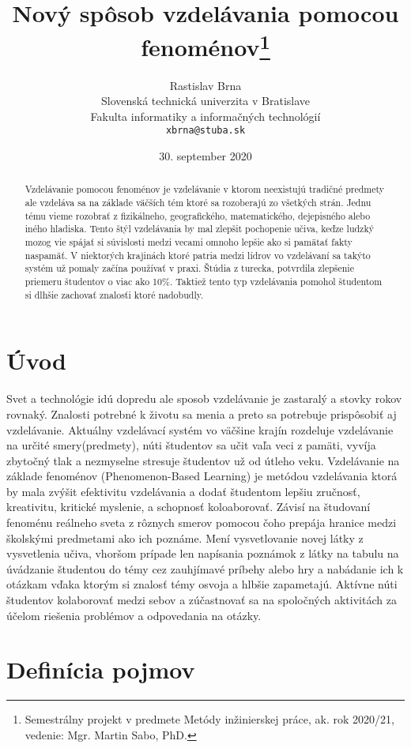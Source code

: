 \documentclass[10pt,slovak,a4paper]{article}
\title{Nový spôsob vzdelávania pomocou fenoménov\thanks{Semestrálny projekt v predmete Metódy inžinierskej práce, ak. rok 2020/21, vedenie: Mgr. Martin Sabo, PhD.}} %
\author{Rastislav Brna\\[2pt]
	{\small Slovenská technická univerzita v Bratislave}\\
	{\small Fakulta informatiky a informačných technológií}\\
	{\small \texttt{xbrna@stuba.sk}}
	}
\date{\small 30. september 2020} %
\begin{document}
\maketitle

\begin{abstract}
	Vzdelávanie pomocou fenoménov je vzdelávanie v ktorom neexistujú 
	tradičné predmety ale vzdeláva sa na základe väčších tém ktoré sa rozoberajú zo všetkých strán.
	Jednu tému vieme rozobrať z fizikálneho, geografického, matematického, dejepisného alebo iného 
	hladiska. Tento štýl vzdelávania by mal zlepšit pochopenie učiva, keďze ludzký mozog vie spájať 
	si súvislosti medzi vecami omnoho lepšie ako si pamätať fakty naspamäť. V niektorých krajinách ktoré
	patria medzi lídrov vo vzdelávaní sa takýto systém už pomaly začína používať v praxi. Štúdia z turecka,
	potvrdila zlepšenie priemeru študentov o viac ako 10\%. Taktiež tento typ vzdelávania pomohol študentom 
	si dlhšie zachovať znalosťi ktoré nadobudly.\cite{jcer553507} 
\end{abstract}

\section{Úvod}

Svet a technológie idú dopredu ale sposob vzdelávanie je zastaralý a stovky rokov rovnaký. Znalosti potrebné k
životu sa menia a preto sa potrebuje prispôsobiť aj vzdelávanie. Aktuálny vzdelávací systém vo väčšine krajín 
rozdeluje vzdelávanie na určité smery(predmety), núti študentov sa učit vaľa veci z pamäti, vyvíja zbytočný tlak
a nezmyselne stresuje študentov už od útleho veku. Vzdelávanie na základe
fenoménov (Phenomenon-Based Learning) je metódou vzdelávania ktorá by mala zvýšit efektivitu vzdelávania
a dodať študentom lepšiu zručnosť, kreativitu, kritické myslenie, a schopnosť koloaborovať. Závisí na študovaní
fenoménu reálneho sveta z rôznych smerov pomocou čoho prepája hranice medzi školskými predmetami ako ich poznáme.
Mení vysvetlovanie novej látky z vysvetlenia učiva, vhoršom prípade len napísania poznámok z látky na tabulu na úvádzanie
študentou do témy cez zauhjímavé príbehy alebo hry a nabádanie ich k otázkam vďaka ktorým si znalosť témy osvoja a hlbšie zapametajú.
Aktívne núti študentov kolaborovať medzi sebov a zúčastnovať sa na spoločných aktivitách za účelom riešenia
problémov a odpovedania na otázky. 

\section{Definícia pojmov}
\end{document}

